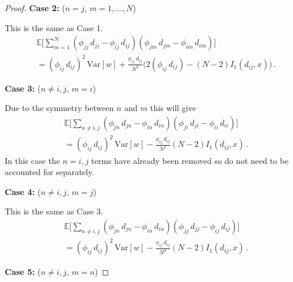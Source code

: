 \documentclass{article}
\newcommand{\EE}{\mathds{E}}
\newcommand{\var}{\text{Var}}
\begin{document}
\begin{proof}
    \textbf{Case 2:} ($n=j$, $m=1,\dots,N$)
    
    This is the same as Case 1. 
    \begin{align*}
        & \EE\Bigg[\sum_{m=1}^N (\phi_{jj} \, d_{jj} - \phi_{ij} \, d_{ij})(\phi_{jm} \, d_{jm} - \phi_{im} \, d_{im}) \Bigg] \\
        &= (\phi_{ij} \, d_{ij} )^2 \, \var[w]  
        + \frac{\phi_{ij} \, d_{ij}}{N^2} \Bigg( 2(\phi_{ij} \, d_{ij} )
        - (N-2) I_1(d_{ij},x) \Bigg) \,.
    \end{align*}
    
    
    \textbf{Case 3:} ($n\neq i,j$, $m=i$)
    
    Due to the symmetry between $n$ and $m$ this will give
    \begin{align*}
        & \EE\Bigg[\sum_{n\neq i,j} (\phi_{jn} \, d_{jn} - \phi_{in} \, d_{in})(\phi_{ji} \, d_{ji} - \phi_{ii} \, d_{ii}) \Bigg] \\
        &= (\phi_{ij} \, d_{ij} )^2 \, \var[w]  
        - \frac{\phi_{ij} \, d_{ij}}{N^2} (N-2) I_1(d_{ij},x) \,.
    \end{align*}
    In this case the $n=i,j$ terms have already been removed so do not need to be accounted for separately. 
    
    \textbf{Case 4:} ($n\neq i,j$, $m=j$)
    
    This is the same as Case 3. 
    \begin{align*}
        & \EE\Bigg[\sum_{n\neq i,j} (\phi_{jn} \, d_{jn} - \phi_{in} \, d_{in})(\phi_{jj} \, d_{jj} - \phi_{ij} \, d_{ij}) \Bigg] \\
        &= (\phi_{ij} \, d_{ij} )^2 \, \var[w]  
        - \frac{\phi_{ij} \, d_{ij}}{N^2} (N-2) I_1(d_{ij},x) \,.
    \end{align*}
    
    
    \textbf{Case 5:} ($n\neq i,j$, $m=n$)
    

\end{proof}
\end{document}
